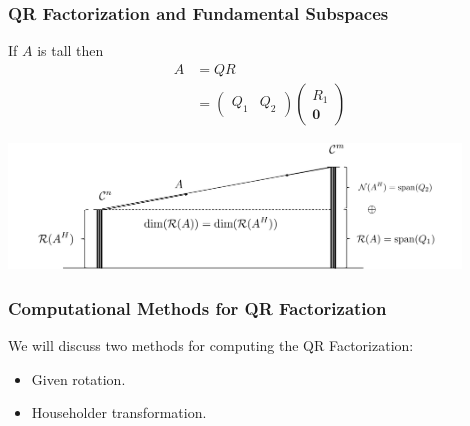 \documentclass{beamer}
\begin{document}
\begin{frame}\frametitle{QR Factorization and Fundamental Subspaces}

	If $A$ is tall then
	\begin{align*}
		A &= QR \\
  		  &= \begin{pmatrix} 
  		  		Q_1 & Q_2 
  		  	  \end{pmatrix}
  		  	  \begin{pmatrix} 
  		  	  	R_1 \\ \mathbf{0} 
  		  	  \end{pmatrix}	
	\end{align*}

	
	\begin{center}
	\includegraphics[width=0.9\textwidth]{figures/chap5_qr_subspaces}
	\end{center}

	
\end{frame}




\begin{frame}\frametitle{Computational Methods for QR Factorization}

	We will discuss two methods for computing the QR Factorization:

	\begin{itemize}
		\item Given rotation.		
		\item Householder transformation.
	\end{itemize}

\end{frame}
\end{document}
